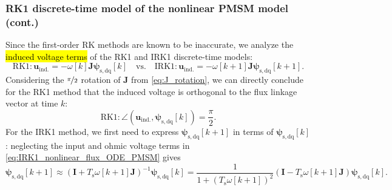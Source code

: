 \begin{frame}
    \frametitle{RK1 discrete-time model of the nonlinear PMSM model (cont.)}
    Since  the first-order RK methods are known to be inaccurate, we analyze the \hl{induced voltage terms} of the RK1 and IRK1 discrete-time models:
    \begin{equation}
        \text{RK1:} \, \bm{u}_\mathrm{ind.} = -\omega[k]\bm{J}\bm{\psi}_\mathrm{s,dq}[k] \quad \text{vs.} \quad \text{IRK1:} \, \bm{u}_\mathrm{ind.} = -\omega[k+1]\bm{J}\bm{\psi}_\mathrm{s,dq}[k+1].
        \label{eq:induc_voltages_RK1_IRK1_nonlinear_flux_ODE_PMSM}
    \end{equation}\pause
    Considering the $\nicefrac{\pi}{2}$ rotation of $\bm{J}$ from \eqref{eq:J_rotation}, we can directly conclude for the RK1 method that the induced voltage is orthogonal to the flux linkage vector at time $k$:
    \begin{equation*}
        \text{RK1:} \, \angle\left(\bm{u}_\mathrm{ind.}, \bm{\psi}_\mathrm{s,dq}[k]\right) = \frac{\pi}{2}.
    \end{equation*}\pause
    For the IRK1 method, we first need to express $\bm{\psi}_\mathrm{s,dq}[k+1]$ in terms of $\bm{\psi}_\mathrm{s,dq}[k]$: neglecting the input and ohmic voltage terms in \eqref{eq:IRK1_nonlinear_flux_ODE_PMSM} gives
    $$
        \bm{\psi}_\mathrm{s,dq}[k+1] \approx \left(\bm{I} + T_\mathrm{s}\omega[k+1]\bm{J}\right)^{-1}\bm{\psi}_\mathrm{s,dq}[k] = \frac{1}{1+(T_\mathrm{s}\omega[k+1])^2}\left(\bm{I} - T_\mathrm{s}\omega[k+1]\bm{J}\right)\bm{\psi}_\mathrm{s,dq}[k].
    $$
\end{frame}

